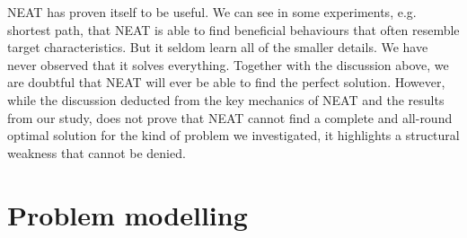 

NEAT has proven itself to be useful. We can see in some experiments, e.g. shortest path, that NEAT is able to find beneficial behaviours that often resemble target characteristics. But it seldom learn all of the smaller details. We have never observed that it solves everything. Together with the discussion above, we are doubtful that NEAT will ever be able to find the perfect solution. However, while the discussion deducted from the key mechanics of NEAT and the results from our study, does not prove that NEAT cannot find a complete and all-round optimal solution for the kind of problem we investigated, it highlights a structural weakness that cannot be denied.





\section{Problem modelling}


